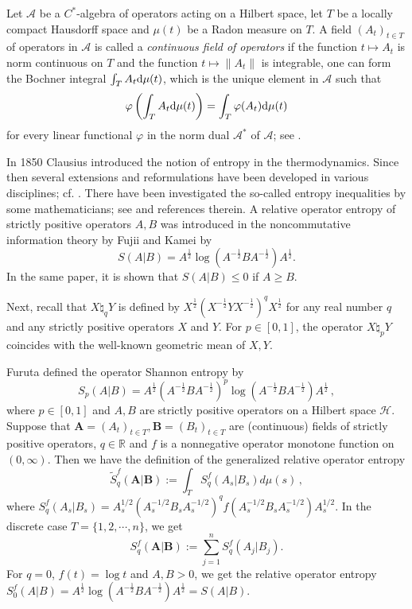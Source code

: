 \documentclass[12pt, reqno]{amsart}
\theoremstyle{definition}
\theoremstyle{remark}
\numberwithin{equation}{section}
\begin{document}
Let ${\mathscr A}$ be a $C^*$-algebra of operators acting on  a Hilbert space, let $T$ be a locally compact Hausdorff space and  $\mu(t)$ be a Radon measure on $T$. A field $(A_t)_{t\in T}$ of operators in ${\mathscr A}$ is called a \textit{continuous field of operators} if the function $t\mapsto A_t$ is norm continuous on $T$ and the function $t \mapsto\|A_t\|$ is integrable, one can form the Bochner integral $\int_{T}A_t{\rm d}\mu(t)$, which is the unique element in ${\mathscr A}$ such that
\begin{equation}\label{e1}
\varphi\left(\int_TA_t{\rm d}\mu(t)\right)=\int_T\varphi(A_t){\rm d}\mu(t)
\end{equation}
for every linear functional $\varphi$ in the norm dual ${\mathscr A}^*$ of ${\mathscr A}$; see \cite{han}.

In 1850 Clausius \cite{Cl} introduced the notion of entropy in the thermodynamics. Since then several extensions and reformulations have been developed in various disciplines; cf. \cite{ME, LR, L, NU}. There have been investigated the so-called entropy inequalities by some mathematicians; see \cite{BLP, BS, FUR2} and references therein. A relative operator entropy of strictly positive operators $A,B$ was introduced in the
noncommutative information theory by Fujii and Kamei \cite{FK} by
$$
S(A|B) = A^{\frac{1}{2}} \log(A^{-\frac{1}{2}}BA^{-\frac{1}{2}})A^{\frac{1}{2}}.
$$
In the same paper, it is shown that $S(A|B) \le 0$ if $A \ge B$.

Next, recall that $X\natural_q Y$ is defined by $X^{\frac{1}{2}}\left(X^{-\frac{1}{2}}YX^{-\frac{1}{2}}\right)^qX^{\frac{1}{2}}$ for any real number $q$ and any strictly positive operators $X$ and $Y$. For $p\in[0,1]$, the operator $X \natural_p Y$ coincides with the well-known geometric mean of $X, Y$.

Furuta \cite{F} defined the operator Shannon entropy by
$$
S_p(A|B)=A^{\frac{1}{2}}\left(A^{-\frac{1}{2}}BA^{-\frac{1}{2}}\right)^p\log\left(A^{-\frac{1}{2}}BA^{-\frac{1}{2}}\right)A^{\frac{1}{2}}\,,
$$
where $p\in[0, 1]$ and $A, B$ are strictly positive operators on a Hilbert space $\mathscr {H}$. Suppose that   $\mathbf{A}=(A_t)_{t\in T},\mathbf{B}=(B_t)_{t\in T}$ are (continuous) fields of strictly positive operators, $q\in\mathbb R$ and $f$ is a nonnegative operator monotone function on $(0,\infty)$. Then we have the definition of the generalized relative operator entropy
\begin{equation}\label{ShEn321}
\widetilde{S}_q^f(\mathbf{A}|\mathbf{B}):=\int_TS_q^f(A_s|B_s)d\mu(s)\,,
\end{equation}
where $S^f_q(A_s|B_s)=A_s^{1/2}\left(A_s^{-1/2}B_sA_s^{-1/2}\right)^qf\left(A_s^{-1/2}B_sA_s^{-1/2}\right)A_s^{1/2}$. In the discrete case $T=\{1,2,\cdots,n\}$, we get
\begin{equation}\label{ShEn}
S_q^f(\mathbf{A}|\mathbf{B}):=\sum_{j=1}^nS_q^f(A_j|B_j).
\end{equation}
For $q=0$, $f(t)=\log t$ and $A, B>0$, we get the relative operator entropy $S_0^f(A|B)=A^{\frac{1}{2}}\log\left(A^{-\frac{1}{2}}BA^{-\frac{1}{2}}\right)A^{\frac{1}{2}}=S(A|B)$.
\end{document}
